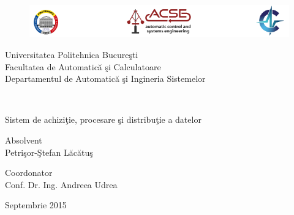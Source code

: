 \documentclass[a4paper,12pt, oneside, titlepage]{book}
\begin{document}
\pagestyle{empty}    
\begingroup
{}


\begin{titlepage}
\thispagestyle{empty}
\begin{figure}[H]
	\centering
	\includegraphics[width=1.2\textwidth, center]{logos}
\end{figure}
\begin{center}
	\large{Universitatea Politehnica Bucureşti\\
	Facultatea de Automatică şi Calculatoare\\
	Departamentul de Automatică şi Ingineria Sistemelor\\}
\end{center}
\mbox{}\\[6pc]
\begin{center}
	
	\Huge{Sistem de achiziţie, procesare şi distribuţie a datelor}\\[2pc]
	
\end{center}
\vfill
\begin{flushright} 
	\Large{Absolvent \\
		Petrişor-Ştefan Lăcătuş}\\[1pc]
\end{flushright}
\noindent \Large{Coordonator\\
	 Conf. Dr. Ing. Andreea Udrea}\\

\begin{center} 
	\large{Septembrie 2015}\\[2pc]
\end{center}
\end{titlepage}


\tableofcontents 

\endgroup %

\clearpage
\pagestyle{plain}      



 

 

 



  

\printbibliography[heading=bibintoc, title={Bibliografie}]
\end{document}
